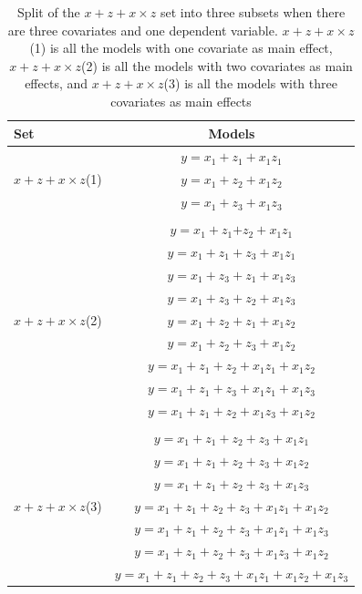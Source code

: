\begin{table}[hbt!]
\caption{Split of the $x + z + x \times z$ set into three subsets when there are three covariates and one dependent variable. $x + z + x \times z$(1) is all the models with one covariate as main effect, $x + z + x \times z$(2) is all the models with two covariates as main effects, and $x + z + x \times z$(3) is all the models with three covariates as main effects}
\centering
\begin{tabular}{lc}  
\toprule
Set & Models \\
\midrule
\multirow{3}{*}{$x + z + x \times z$(1)} & $y=x_1+z_1+x_1z_1$\\ & $y=x_1+z_2+x_1z_2$\\ & $y=x_1+z_3+x_1z_3$\\ & \\ 
\multirow{9}{*}{$x + z + x \times z$(2)} & $y=x_1+z_1$$+z_2+x_1z_1$\\ & $y=x_1+z_1+z_3+x_1z_1$\\ & $y=x_1+z_3+z_1+x_1z_3$\\ & $y=x_1+z_3+z_2+x_1z_3$\\ & $y=x_1+z_2+z_1+x_1z_2$\\ & $y=x_1+z_2+z_3+x_1z_2$\\ & $y=x_1+z_1+z_2+x_1z_1+x_1z_2$\\ & $y=x_1+z_1+z_3+x_1z_1+x_1z_3$\\ & $y=x_1+z_1+z_2+x_1z_3+x_1z_2$\\  & \\  
\multirow{7}{*}{$x + z + x \times z$(3)} & $y=x_1+z_1+z_2+z_3+x_1z_1$\\ & $y=x_1+z_1+z_2+z_3+x_1z_2$\\ & $y=x_1+z_1+z_2+z_3+x_1z_3$\\ & $y=x_1+z_1+z_2+z_3+x_1z_1+x_1z_2$\\ & $y=x_1+z_1+z_2+z_3+x_1z_1+x_1z_3$\\ & $y=x_1+z_1+z_2+z_3+x_1z_3+x_1z_2$\\ & $y=x_1+z_1+z_2+z_3+x_1z_1+x_1z_2+x_1z_3$\\  
\bottomrule
\end{tabular}
\end{table}

